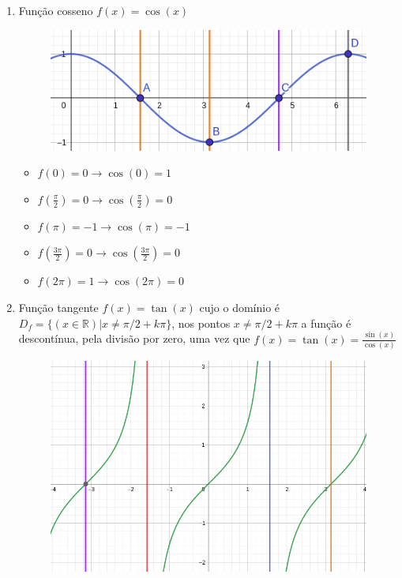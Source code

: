 \begin{multicols*}{2}
\begin{enumerate}[wide, labelwidth=!, labelindent=0pt]
        \item Função cosseno $f(x) = \cos(x)$
              \begin{figure}[H]
                  \centering
                  \includegraphics[scale=0.35]{assets/rafael/img34.png}
              \end{figure}
              \begin{itemize}
                  \item $f(0) = 0 \rightarrow \cos(0) = 1 $
                  \item $f\left(\frac{\pi}{2} \right) = 0 \rightarrow \cos \left( \frac{\pi}{2} \right) = 0 $
                  \item $f(\pi) = -1 \rightarrow \cos(\pi) = -1$
                  \item $f\left( \frac{3 \pi}{2} \right) = 0 \rightarrow \cos \left( \frac{3 \pi}{2}\right) = 0$
                  \item $f(2 \pi) = 1 \rightarrow \cos(2 \pi) = 0$
              \end{itemize}

        \item Função tangente $f(x) = \tan(x)$ cujo o domínio é
              $D_f = \{(x \in \mathbb{R}) | x \ne \pi /2 + k\pi \}$, nos pontos $x \ne \pi /2 + k\pi$ a função é descontínua, pela divisão por zero, uma vez que $f(x) = \tan(x) = \frac{\sin(x)}{\cos(x)}$

              \begin{figure}[H]
                  \centering
                  \includegraphics[scale=0.3]{assets/rafael/img35.png}
              \end{figure}


\end{enumerate}
\end{multicols*}
